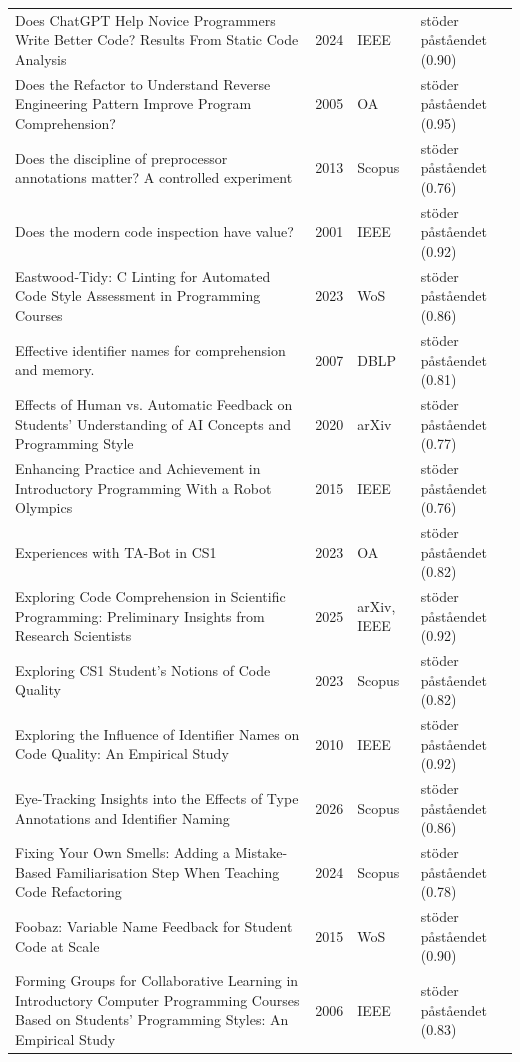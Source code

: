 \begin{longtable}{@{}%
  >{\raggedright\arraybackslash}p{}c%
  >{\raggedright\arraybackslash}p{}%
  >{\raggedright\arraybackslash}p{}@{}}
Does ChatGPT Help Novice Programmers Write Better Code? Results From Static Code Analysis & 2024 & IEEE & stöder påståendet (0.90) \\
Does the \textquotedbl{}Refactor to Understand\textquotedbl{} Reverse Engineering Pattern Improve Program Comprehension? & 2005 & OA & stöder påståendet (0.95) \\
Does the discipline of preprocessor annotations matter? A controlled experiment & 2013 & Scopus & stöder påståendet (0.76) \\
Does the modern code inspection have value? & 2001 & IEEE & stöder påståendet (0.92) \\
Eastwood-Tidy: C Linting for Automated Code Style Assessment in Programming Courses & 2023 & WoS & stöder påståendet (0.86) \\
Effective identifier names for comprehension and memory. & 2007 & DBLP & stöder påståendet (0.81) \\
Effects of Human vs. Automatic Feedback on Students' Understanding of AI Concepts and Programming Style & 2020 & arXiv & stöder påståendet (0.77) \\
Enhancing Practice and Achievement in Introductory Programming With a Robot Olympics & 2015 & IEEE & stöder påståendet (0.76) \\
Experiences with TA-Bot in CS1 & 2023 & OA & stöder påståendet (0.82) \\
Exploring Code Comprehension in Scientific Programming: Preliminary Insights from Research Scientists & 2025 & arXiv, IEEE & stöder påståendet (0.92) \\
Exploring CS1 Student's Notions of Code Quality & 2023 & Scopus & stöder påståendet (0.82) \\
Exploring the Influence of Identifier Names on Code Quality: An Empirical Study & 2010 & IEEE & stöder påståendet (0.92) \\
Eye-Tracking Insights into the Effects of Type Annotations and Identifier Naming & 2026 & Scopus & stöder påståendet (0.86) \\
Fixing Your Own Smells: Adding a Mistake-Based Familiarisation Step When Teaching Code Refactoring & 2024 & Scopus & stöder påståendet (0.78) \\
Foobaz: Variable Name Feedback for Student Code at Scale & 2015 & WoS & stöder påståendet (0.90) \\
Forming Groups for Collaborative Learning in Introductory Computer Programming Courses Based on Students' Programming Styles: An Empirical Study & 2006 & IEEE & stöder påståendet (0.83) \\

\end{longtable}
